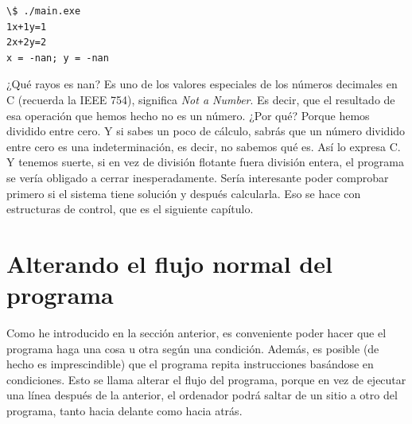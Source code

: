 \documentclass[a4paper]{article}
\begin{document}
\noindent
\begin{minipage}[H]{\linewidth}
\mbox{}
\begin{lstlisting}[style=terminalStyle]
\$ ./main.exe
1x+1y=1
2x+2y=2
x = -nan; y = -nan
\end{lstlisting}
\end{minipage}


¿Qué rayos es nan? Es uno de los valores especiales de los números decimales en
C (recuerda la IEEE 754), significa \textit{Not a Number}. Es decir, que el
resultado de esa operación que hemos hecho no es un número. ¿Por qué? Porque
hemos dividido entre cero. Y si sabes un poco de cálculo, sabrás que un número
dividido entre cero es una indeterminación, es decir, no sabemos qué es. Así lo
expresa C. Y tenemos suerte, si en vez de división flotante fuera división
entera, el programa se vería obligado a cerrar inesperadamente. Sería
interesante poder comprobar primero si el sistema tiene solución y después
calcularla. Eso se hace con estructuras de control, que es el siguiente
capítulo.

\section{Alterando el flujo normal del programa}
Como he introducido en la sección anterior, es conveniente poder hacer que el
programa haga una cosa u otra según una condición. Además, es posible (de hecho
es imprescindible) que el programa repita instrucciones basándose en
condiciones. Esto se llama alterar el flujo del programa, porque en vez de
ejecutar una línea después de la anterior, el ordenador podrá saltar de
un sitio a otro del programa, tanto hacia delante como hacia atrás.
\end{document}
